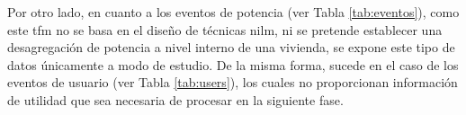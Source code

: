 \vspace{3mm}

Por otro lado, en cuanto a los eventos de potencia (ver Tabla \ref{tab:eventos}), como este \gls{tfm} no se basa en el diseño de técnicas \gls{nilm}, ni se pretende establecer una desagregación de potencia a nivel interno de una vivienda, se expone este tipo de datos únicamente a modo de estudio. De la misma forma, sucede en el caso de los eventos de usuario (ver Tabla \ref{tab:users}), los cuales no proporcionan información de utilidad que sea necesaria de procesar en la siguiente fase.

